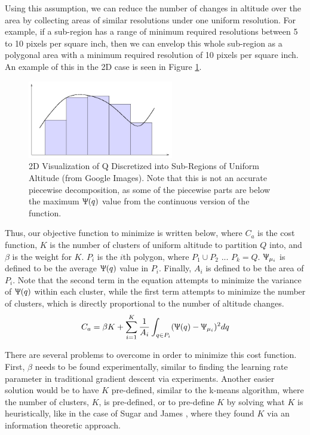 \documentclass[conference]{IEEEtran}
\theoremstyle{plain}%
\begin{document}
Using this assumption, we can reduce the number of changes in altitude over the area by collecting areas of similar resolutions under one uniform resolution. For example, if a sub-region has a range of minimum required resolutions between 5 to 10 pixels per square inch, then we can envelop this whole sub-region as a polygonal area with a minimum required resolution of 10 pixels per square inch. An example of this in the 2D case is seen in Figure \ref{uniform_alt_ex}.

\begin{figure}[!t]
\centering
\includegraphics[width=2.5in]{rect_integ}
\caption{2D Visualization of Q Discretized into Sub-Regions of Uniform Altitude (from Google Images). Note that this is not an accurate piecewise decomposition, as some of the piecewise parts are below the maximum $\Uppsi(q)$ value from the continuous version of the function.}
\label{uniform_alt_ex}
\end{figure}

Thus, our objective function to minimize is written below, where $C_a$ is the cost function, $K$ is the number of clusters of uniform altitude to partition $Q$ into, and $\beta$ is the weight for $K$. $P_i$ is the $i$th polygon, where $P_1 \cup P_2$ ... $P_k = Q$. $\Uppsi_{\mu_i}$ is defined to be the average $\Uppsi(q)$ value in $P_i$. Finally, $A_i$ is defined to be the area of $P_i$. Note that the second term in the equation attempts to minimize the variance of $\Uppsi(q)$ within each cluster, while the first term attempts to minimize the number of clusters, which is directly proportional to the number of altitude changes.
\begin{equation} \label{eq:minaltcost}
C_a =  \beta K + \sum_{i=1}^{K} \frac{1}{A_i} \int_{q \in P_i} (\Uppsi(q)-\Uppsi_{\mu_i})^2 dq
\end{equation}

There are several problems to overcome in order to minimize this cost function. First, $\beta$ needs to be found experimentally, similar to finding the learning rate parameter in traditional gradient descent via experiments. Another easier solution would be to have $K$ pre-defined, similar to the k-means algorithm, where the number of clusters, $K$, is pre-defined, or to pre-define $K$ by solving what $K$ is heuristically, like in the case of Sugar and James \cite{sugar2011finding}, where they found $K$ via an information theoretic approach.
\end{document}
